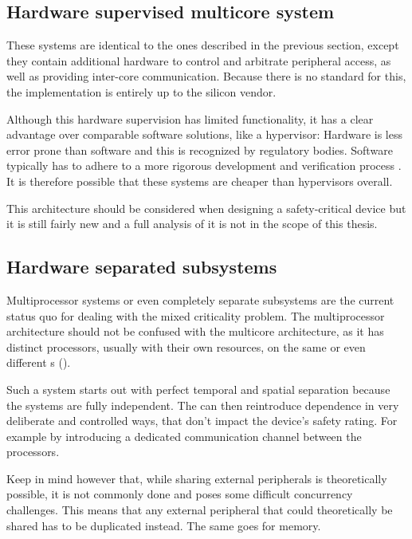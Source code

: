 \subsection{Hardware supervised multicore system}
These systems are identical to the ones described in the previous section, except they contain additional hardware to control and arbitrate peripheral access, as well as providing inter-core communication.
Because there is no standard for this, the implementation is entirely up to the silicon vendor. 

Although this hardware supervision has limited functionality, it has a clear advantage over comparable software solutions, like a hypervisor: Hardware is less error prone than software and this is recognized by regulatory bodies. Software typically has to adhere to a more rigorous development and verification process \cite{IEC.2010-3}. It is therefore possible that these systems are cheaper than hypervisors overall. 

This architecture should be considered when designing a safety-critical device but it is still fairly new and a full analysis of it is not in the scope of this thesis.
\subsection{Hardware separated subsystems \label{HSS}}
Multiprocessor systems or even completely separate subsystems are the current status quo for dealing with the mixed criticality problem. The multiprocessor architecture should not be confused with the multicore architecture, as it has distinct processors, usually with their own resources, on the same or even different s ().

Such a system starts out with perfect temporal and spatial separation because the systems are fully independent. The \mfg{} can then reintroduce dependence in very deliberate and controlled ways, that don't impact the device's safety rating. For example by introducing a dedicated communication channel between the processors. 

Keep in mind however that, while sharing external peripherals is theoretically possible, it is not commonly done and poses some difficult concurrency challenges. This means that any external peripheral that could theoretically be shared has to be duplicated instead. The same goes for memory.

